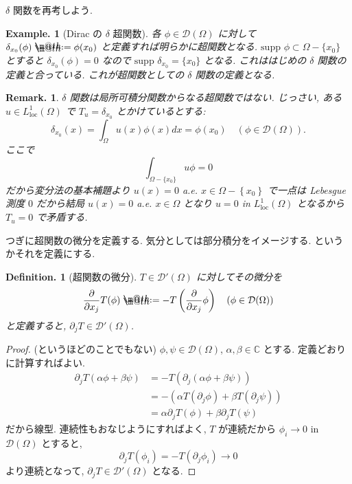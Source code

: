 \documentclass[openany, a4paper, oneside]{jsbook}
\makeatletter
\newcommand*{\defeq}{\mathrel{\rlap{%
\raisebox{0.3ex}{$\m@th\cdot$}}%
\raisebox{-0.3ex}{$\m@th\cdot$}}%
=}
\theoremstyle{break}
\theoremstyle{breakdefn}
\newtheorem{defn}[thm]{Definition.}
\newtheorem{ex}[thm]{Example.}
\newtheorem{rem}[thm]{Remark.}
\newcommand{\rbk}[1]{\left (#1\right)}
\newcommand{\cbk}[1]{\left\{#1\right\}}
\newcommand{\Loneloc}{L_{\mathrm{loc}}^1}
\newcommand{\supp}{\mathrm{supp} \,}
\makeatother
\begin{document}
$\delta$ 関数を再考しよう.
\begin{ex}[Dirac の $\delta$ 超関数]
 各 $\phi \in \mathcal{D}(\Omega)$ に対して
 $\delta_{x_0}(\phi) \defeq \phi (x_0)$ と定義すれば明らかに超関数となる.
 $\supp \, \phi \subset \Omega - \{x_0\}$ とすると
 $\delta_{x_0}(\phi) = 0$ なので $\supp \, \delta_{x_0} = \{ x_0 \}$ となる.
 これははじめの $\delta$ 関数の定義と合っている.
 これが超関数としての $\delta$ 関数の定義となる.
\end{ex}
\begin{rem}
 $\delta$ 関数は局所可積分関数からなる超関数ではない.
 じっさい, ある $u \in \Loneloc (\Omega)$ で $T_u = \delta_{x_0}$ とかけているとする:
 \begin{equation}
  \delta_{x_0}(x)
  =
  \int_{\Omega}u (x)\phi (x) dx
  =
  \phi (x_0) \quad (\phi \in \mathcal{D}(\Omega)).
 \end{equation}
 ここで
 \begin{equation}
  \int_{\Omega - \{x_0\}}u\phi
  =
  0
 \end{equation}
 だから変分法の基本補題より $u (x) = 0$ a.e. $x \in \Omega - \cbk{x_0}$ で一点は
 Lebesgue 測度 $0$ だから結局 $u (x) = 0$ a.e. $x \in \Omega$ となり
 $u = 0 $ in $\Loneloc (\Omega)$ となるから $T_u = 0$ で矛盾する.
\end{rem}

つぎに超関数の微分を定義する.
気分としては部分積分をイメージする.
というかそれを定義にする.
\begin{defn}[超関数の微分]
 $T \in \mathcal{D}'(\Omega)$ に対してその微分を
 \begin{equation}
  \frac{\partial}{\partial x_j}T (\phi)
  \defeq
  -T \rbk{\frac{\partial}{\partial x_j}\phi} \quad (\phi \in \mathcal{D}(\Omega))
 \end{equation}
 と定義すると, $\partial_j T \in \mathcal{D}'(\Omega)$.
\end{defn}
\begin{proof}(というほどのことでもない)
$\phi, \psi \in \mathcal{D}(\Omega)$, $\alpha, \beta \in \mathbb{C}$ とする.
定義どおりに計算すればよい.
\begin{equation}
 \begin{split}
  \partial_j T (\alpha \phi + \beta \psi)
  &=
  -T (\partial_j (\alpha \phi + \beta \psi)) \\
  &=
  -(\alpha T (\partial_j\phi) + \beta T (\partial_j\psi)) \\
  &=
  \alpha \partial_jT (\phi) + \beta \partial_jT (\psi)
 \end{split}
\end{equation}
だから線型.
連続性もおなじようにすればよく, $T$ が連続だから $\phi_i \to 0$ in $\mathcal{D}(\Omega)$ とすると,
\begin{equation}
 \partial_jT (\phi_i)
 =
 -T (\partial_j \phi_i) \to 0
\end{equation}
より連続となって, $\partial_j T \in \mathcal{D}'(\Omega)$ となる.
\end{proof}
\end{document}
